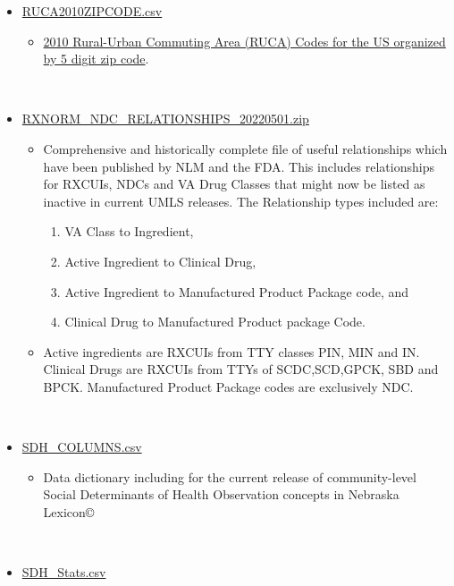 \documentclass[
]{journal}
\providecommand{\tightlist}{%
  \setlength{\itemsep}{0pt}\setlength{\parskip}{0pt}}
\begin{document}
\begin{itemize}
\tightlist
\item
  \href{https://github.com/UNMC-CRANE/AMIA_Workshop_May_2022/blob/main/Handouts/RUCA2010ZIPCODE.csv}{RUCA2010ZIPCODE.csv}

  \begin{itemize}
  \tightlist
  \item
    \href{https://ers.usda.gov/data-products/rural-urban-commuting-area-codes/}{2010 Rural-Urban Commuting Area (RUCA) Codes for the US organized by 5 digit zip code}.\\
    \strut \\
  \end{itemize}
\item
  \href{https://github.com/UNMC-CRANE/AMIA_Workshop_May_2022/blob/main/Handouts/RXNORM_NDC_RELATIONSHIPS_20220501.zip}{RXNORM\_NDC\_RELATIONSHIPS\_20220501.zip}

  \begin{itemize}
  \tightlist
  \item
    Comprehensive and historically complete file of useful relationships which have been published by NLM and the FDA. This includes relationships for RXCUIs, NDCs and VA Drug Classes that might now be listed as inactive in current UMLS releases. The Relationship types included are:

    \begin{enumerate}
    \def\labelenumi{\arabic{enumi})}
    \tightlist
    \item
      VA Class to Ingredient,
    \item
      Active Ingredient to Clinical Drug,
    \item
      Active Ingredient to Manufactured Product Package code, and
    \item
      Clinical Drug to Manufactured Product package Code.
    \end{enumerate}
  \item
    Active ingredients are RXCUIs from TTY classes PIN, MIN and IN. Clinical Drugs are RXCUIs from TTYs of SCDC,SCD,GPCK, SBD and BPCK. Manufactured Product Package codes are exclusively NDC.\\
    \strut \\
  \end{itemize}
\item
  \href{https://github.com/UNMC-CRANE/AMIA_Workshop_May_2022/blob/main/Handouts/SDH_Columns.csv}{SDH\_COLUMNS.csv}

  \begin{itemize}
  \tightlist
  \item
    Data dictionary including for the current release of community-level Social Determinants of Health Observation concepts in Nebraska Lexicon©\\
    \strut \\
  \end{itemize}
\item
  \href{https://github.com/UNMC-CRANE/AMIA_Workshop_May_2022/blob/main/Handouts/SDH_Stats.csv}{SDH\_Stats.csv}


\end{itemize}
\end{document}
